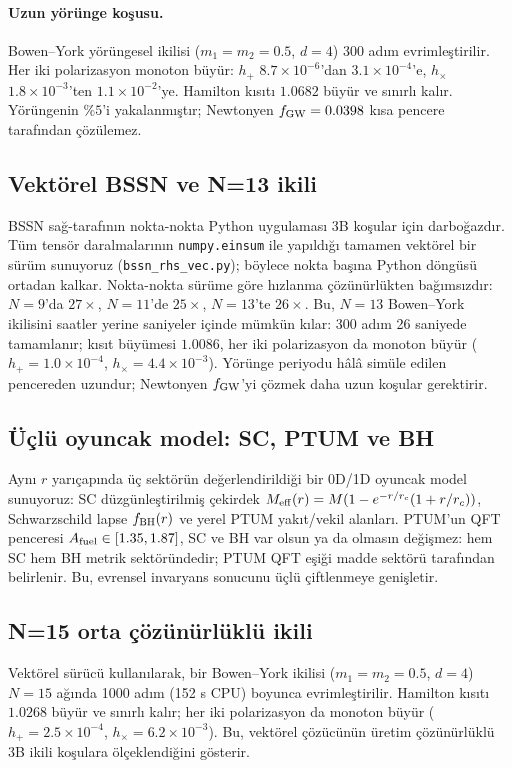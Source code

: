\paragraph{Uzun yörünge koşusu.}
Bowen--York yörüngesel ikilisi ($m_1 = m_2 = 0.5$, $d = 4$)
300 adım evrimleştirilir. Her iki polarizasyon monoton büyür:
$h_+$ $8.7\times 10^{-6}$'dan $3.1\times 10^{-4}$'e, $h_\times$
$1.8\times 10^{-3}$'ten $1.1\times 10^{-2}$'ye. Hamilton kısıtı
$1.0682$ büyür ve sınırlı kalır. Yörüngenin $\%5$'i yakalanmıştır;
Newtonyen $f_{\rm GW} = 0.0398$ kısa pencere tarafından
çözülemez.

\subsection{Vektörel BSSN ve N=13 ikili}
BSSN sağ-tarafının nokta-nokta Python uygulaması 3B koşular için
darboğazdır. Tüm tensör daralmalarının \texttt{numpy.einsum} ile
yapıldığı tamamen vektörel bir sürüm sunuyoruz
(\texttt{bssn\_rhs\_vec.py}); böylece nokta başına Python döngüsü
ortadan kalkar. Nokta-nokta sürüme göre hızlanma çözünürlükten
bağımsızdır: $N=9$'da $27\times$, $N=11$'de $25\times$, $N=13$'te
$26\times$. Bu, $N=13$ Bowen--York ikilisini saatler yerine saniyeler
içinde mümkün kılar: 300 adım 26 saniyede tamamlanır; kısıt büyümesi
$1.0086$, her iki polarizasyon da monoton büyür ($h_+ = 1.0\times
10^{-4}$, $h_\times = 4.4\times 10^{-3}$). Yörünge periyodu hâlâ
simüle edilen pencereden uzundur; Newtonyen $f_{\rm GW}$'yi çözmek
daha uzun koşular gerektirir.

\subsection{Üçlü oyuncak model: SC, PTUM ve BH}
Aynı $r$ yarıçapında üç sektörün değerlendirildiği bir 0D/1D
oyuncak model sunuyoruz: SC düzgünleştirilmiş çekirdek
$M_{\rm eff}(r) = M(1 - e^{-r/r_c}(1 + r/r_c))$, Schwarzschild
lapse $f_{\rm BH}(r)$ ve yerel PTUM yakıt/vekil alanları. PTUM'un
QFT penceresi $A_{\rm fuel} \in [1.35, 1.87]$, SC ve BH var olsun
ya da olmasın değişmez: hem SC hem BH metrik sektöründedir;
PTUM QFT eşiği madde sektörü tarafından belirlenir. Bu, evrensel
invaryans sonucunu üçlü çiftlenmeye genişletir.

\subsection{N=15 orta çözünürlüklü ikili}
Vektörel sürücü kullanılarak, bir Bowen--York ikilisi ($m_1 = m_2
= 0.5$, $d = 4$) $N = 15$ ağında 1000 adım (152 s CPU) boyunca
evrimleştirilir. Hamilton kısıtı $1.0268$ büyür ve sınırlı kalır;
her iki polarizasyon da monoton büyür ($h_+ = 2.5\times 10^{-4}$,
$h_\times = 6.2\times 10^{-3}$). Bu, vektörel çözücünün üretim
çözünürlüklü 3B ikili koşulara ölçeklendiğini gösterir.


